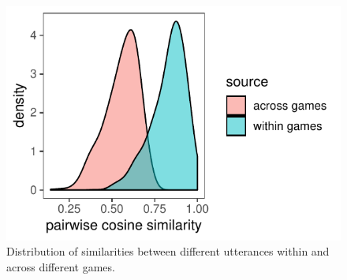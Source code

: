 \documentclass[alpha-refs]{wiley-article}
\begin{document}
\begin{figure}[t!]
\centering
\includegraphics[scale=.75]{across_vs_within.pdf}
\caption{Distribution of similarities between different utterances within and across different games.}
\label{fig:withinvsacross}
\end{figure}
\end{document}
